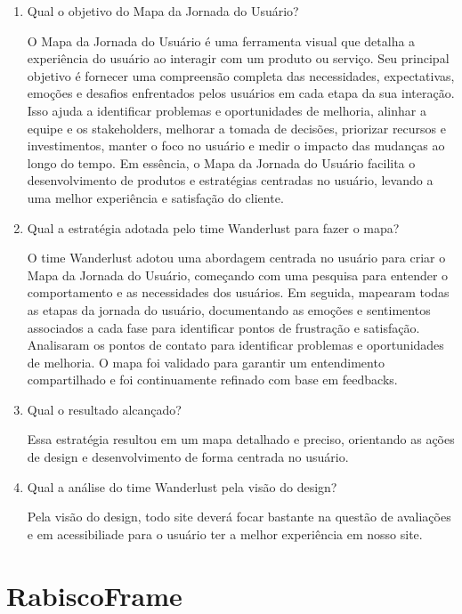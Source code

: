 \documentclass{article}
\begin{document}
\begin{enumerate}
      \item Qual o objetivo do Mapa da Jornada do Usuário?

            O Mapa da Jornada do Usuário é uma ferramenta visual que detalha a experiência do usuário ao interagir com um produto ou serviço. Seu principal objetivo é fornecer uma compreensão completa das necessidades, expectativas, emoções e desafios enfrentados pelos usuários em cada etapa da sua interação. Isso ajuda a identificar problemas e oportunidades de melhoria, alinhar a equipe e os stakeholders, melhorar a tomada de decisões, priorizar recursos e investimentos, manter o foco no usuário e medir o impacto das mudanças ao longo do tempo. Em essência, o Mapa da Jornada do Usuário facilita o desenvolvimento de produtos e estratégias centradas no usuário, levando a uma melhor experiência e satisfação do cliente.

      \item Qual a estratégia adotada pelo time Wanderlust para fazer o mapa?

            O time Wanderlust adotou uma abordagem centrada no usuário para criar o Mapa da Jornada do Usuário, começando com uma pesquisa para entender o comportamento e as necessidades dos usuários. Em seguida, mapearam todas as etapas da jornada do usuário, documentando as emoções e sentimentos associados a cada fase para identificar pontos de frustração e satisfação. Analisaram os pontos de contato para identificar problemas e oportunidades de melhoria. O mapa foi validado para garantir um entendimento compartilhado e foi continuamente refinado com base em feedbacks.

      \item Qual o resultado alcançado?

            Essa estratégia resultou em um mapa detalhado e preciso, orientando as ações de design e desenvolvimento de forma centrada no usuário.

      \item Qual a análise do time Wanderlust pela visão do design?

            Pela visão do design, todo site deverá focar bastante na questão de avaliações e em acessibiliade para o usuário ter a melhor experiência em nosso site.

\end{enumerate}

\section{RabiscoFrame}
\end{document}
